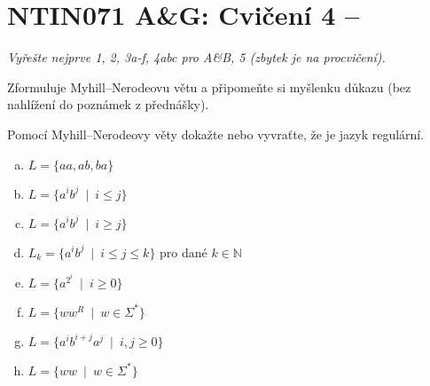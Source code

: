 \documentclass[a4paper,12pt]{amsart}
\begin{document}
\thispagestyle{empty}

\section*{NTIN071 A\&G: Cvičení 4 -- }


\medskip

\noindent\emph{Vyřešte nejprve 1, 2, 3a-f, 4abc pro A\&B, 5 (zbytek je na procvičení).}


\medskip\begin{problem}



\end{problem}


\medskip\begin{problem}
    
    Zformuluje Myhill--Nerodeovu větu a připomeňte si myšlenku důkazu (bez nahlížení do poznámek z přednášky).

\end{problem}


\medskip\begin{problem}

    Pomocí Myhill--Nerodeovy věty dokažte nebo vyvraťte, že je jazyk regulární.

    \begin{multicols}{2}

        \begin{enumerate}[(a)]\setlength\itemsep{6pt}
            \item $L=\{aa, ab, ba\}$
            \item $L=\{a^ib^j\ \mid\ i\leq j\}$
            \item $L=\{a^ib^j\ \mid\ i\geq j\}$
            \item $L_k=\{a^ib^j\ \mid\ i\leq j\leq k\}$ pro dané $k\in\mathbb N$
            \item $L=\{a^{2^i}\ \mid\ i\geq 0\}$
            \item $L=\{ww^R\ \mid \ w\in\Sigma^*\}$%
            \item $L=\{a^ib^{i+j}a^j\ \mid\ i,j\geq 0\}$
            \item $L=\{ww\ \mid \ w\in\Sigma^*\}$
        \end{enumerate}
        
    \end{multicols}
    

\end{problem}
\end{document}
